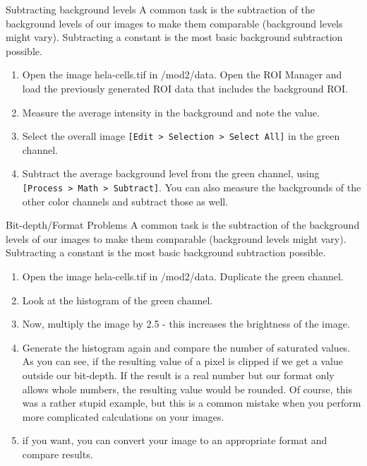 \begin{taskbox}{Subtracting background levels}
A common task is the subtraction of the background levels of our images to make them comparable (background levels might vary). Subtracting a constant is the most basic background subtraction possible. 

\begin{enumerate}
	\item Open the image hela-cells.tif in /mod2/data. Open the ROI Manager and load the previously generated ROI data that includes the background ROI.
	\item Measure the average intensity in the background and note the value.
	\item Select the overall image \texttt{[Edit > Selection > Select All]} in the green channel. 
	\item Subtract the average background level from the green channel, using \texttt{[Process > Math > Subtract]}. You can also measure the backgrounds of the other color channels and subtract those as well.
\end{enumerate}

\end{taskbox}

\begin{taskbox}{Bit-depth/Format Problems}
A common task is the subtraction of the background levels of our images to make them comparable (background levels might vary). Subtracting a constant is the most basic background subtraction possible. 

\begin{enumerate}
	\item Open the image hela-cells.tif in /mod2/data. Duplicate the green channel.
	\item Look at the histogram of the green channel.
	\item Now, multiply the image by 2.5 - this increases the brightness of the image. 
	\item Generate the histogram again and compare the number of saturated values. As you can see, if the resulting value of a pixel is clipped if we get a value outside our bit-depth. If the result is a real number but our format only allows whole numbers, the resulting value would be rounded. Of course, this was a rather stupid example, but this is a common mistake when you perform more complicated calculations on your images.
	\item if you want, you can convert your image to an appropriate format and compare results.

	\end{enumerate}
	
\end{taskbox}

